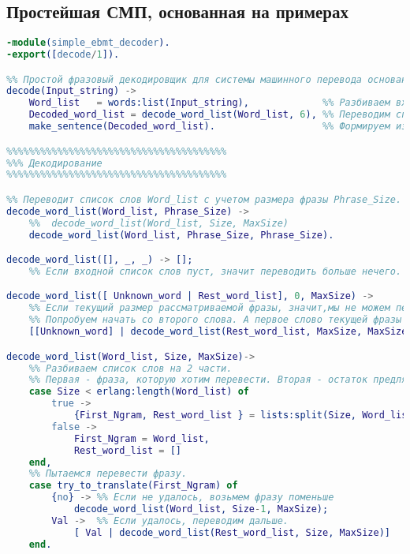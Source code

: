 

\subsection{Простейшая СМП, основанная на примерах}

{ \footnotesize
\begin{lstlisting}[language=erlang]
-module(simple_ebmt_decoder).
-export([decode/1]).

%% Простой фразовый декодировщик для системы машинного перевода основанной на примерах
decode(Input_string) ->
    Word_list   = words:list(Input_string),             %% Разбиваем входную строку на слова.
    Decoded_word_list = decode_word_list(Word_list, 6), %% Переводим список слов.
    make_sentence(Decoded_word_list).                   %% Формируем из него предложение.

%%%%%%%%%%%%%%%%%%%%%%%%%%%%%%%%%%%%%%%
%%% Декодирование
%%%%%%%%%%%%%%%%%%%%%%%%%%%%%%%%%%%%%%%

%% Переводит список слов Word_list с учетом размера фразы Phrase_Size.
decode_word_list(Word_list, Phrase_Size) ->
    %%  decode_word_list(Word_list, Size, MaxSize)
    decode_word_list(Word_list, Phrase_Size, Phrase_Size).

decode_word_list([], _, _) -> [];
    %% Если входной список слов пуст, значит переводить больше нечего.

decode_word_list([ Unknown_word | Rest_word_list], 0, MaxSize) ->
    %% Если текущий размер рассматриваемой фразы, значит,мы не можем перевести эту фразу с начала.
    %% Попробуем начать со второго слова. А первое слово текущей фразы признаем неизвестным.
    [[Unknown_word] | decode_word_list(Rest_word_list, MaxSize, MaxSize)];

decode_word_list(Word_list, Size, MaxSize)->
    %% Разбиваем список слов на 2 части.
    %% Первая - фраза, которую хотим перевести. Вторая - остаток предляжения.
    case Size < erlang:length(Word_list) of
        true ->
            {First_Ngram, Rest_word_list } = lists:split(Size, Word_list);
        false ->
            First_Ngram = Word_list,
            Rest_word_list = []
    end,
    %% Пытаемcя перевести фразу.
    case try_to_translate(First_Ngram) of
        {no} -> %% Если не удалось, возьмем фразу поменьше
            decode_word_list(Word_list, Size-1, MaxSize);
        Val ->  %% Если удалось, переводим дальше.
            [ Val | decode_word_list(Rest_word_list, Size, MaxSize)]
    end.


\end{lstlisting}}
